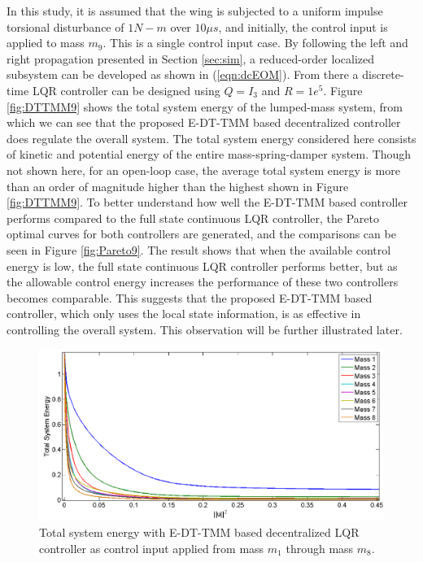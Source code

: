 \documentclass[11pt]{ucthesis}
\begin{document}
In this study, it is assumed that the wing is subjected to a uniform impulse torsional disturbance of $1 N-m$ over $10\mu s$, and initially, the control input is applied to mass $m_9$. This is a single control input case. By following the left and right propagation presented in Section \ref{sec:sim}, a reduced-order localized subsystem can be developed as shown in (\ref{eqn:dcEOM}). From there a discrete-time LQR controller can be designed using $Q = I_3$ and $R = 1e^5$. Figure \ref{fig:DTTMM9} shows the total system energy of the lumped-mass system, from which we can see that the proposed E-DT-TMM based decentralized controller does regulate the overall system. The total system energy considered here consists of kinetic and potential energy of the entire mass-spring-damper system. Though not shown here, for an open-loop case, the average total system energy is more than an order of magnitude higher than the highest shown in Figure \ref{fig:DTTMM9}. To better understand how well the E-DT-TMM based controller performs compared to the full state continuous LQR controller, the Pareto optimal curves for both controllers are generated, and the comparisons can be seen in Figure \ref{fig:Pareto9}. The result shows that when the available control energy is low, the full state continuous LQR controller performs better, but as the allowable control energy increases the performance of these two controllers becomes comparable. This suggests that the proposed E-DT-TMM based controller, which only uses the local state information, is as effective in controlling the overall system. This observation will be further illustrated later. 

\begin{figure}[thpb]
\centering
\includegraphics[width=1\linewidth]{Figures/FirstHalfPareto.png}
\caption{Total system energy with E-DT-TMM based decentralized LQR controller as control input applied from mass $m_1$ through mass $m_8$.}
\label{fig:FirstHalfDPareto}
\end{figure}
 
\end{document}
